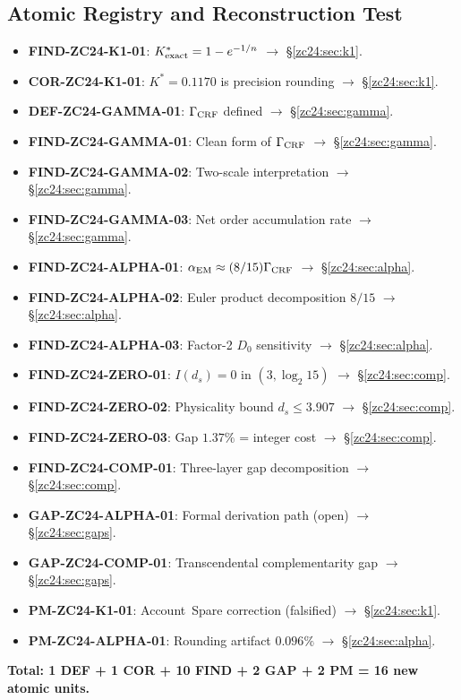 \documentclass[12pt, a4paper]{article}
\begin{document}
\subsection{Atomic Registry and Reconstruction Test}
\label{zc24:sec:registry}

\begin{formalbox}[title={Atomic Units Introduced by TASK-ZC24}]
\begin{itemize}[leftmargin=*]
  \item \textbf{FIND-ZC24-K1-01}: $K^*_{\rm exact}=1-e^{-1/n}$
    $\to$ \S\ref{zc24:sec:k1}.
  \item \textbf{COR-ZC24-K1-01}: $K^*=0.1170$ is precision rounding
    $\to$ \S\ref{zc24:sec:k1}.
  \item \textbf{DEF-ZC24-GAMMA-01}: $\Gamma_{\rm CRF}$ defined
    $\to$ \S\ref{zc24:sec:gamma}.
  \item \textbf{FIND-ZC24-GAMMA-01}: Clean form of $\Gamma_{\rm CRF}$
    $\to$ \S\ref{zc24:sec:gamma}.
  \item \textbf{FIND-ZC24-GAMMA-02}: Two-scale interpretation
    $\to$ \S\ref{zc24:sec:gamma}.
  \item \textbf{FIND-ZC24-GAMMA-03}: Net order accumulation rate
    $\to$ \S\ref{zc24:sec:gamma}.
  \item \textbf{FIND-ZC24-ALPHA-01}: $\alpha_{\rm EM}\approx(8/15)\Gamma_{\rm CRF}$
    $\to$ \S\ref{zc24:sec:alpha}.
  \item \textbf{FIND-ZC24-ALPHA-02}: Euler product decomposition $8/15$
    $\to$ \S\ref{zc24:sec:alpha}.
  \item \textbf{FIND-ZC24-ALPHA-03}: Factor-2 $D_0$ sensitivity
    $\to$ \S\ref{zc24:sec:alpha}.
  \item \textbf{FIND-ZC24-ZERO-01}: $I(d_s)=0$ in $(3,\log_2 15)$
    $\to$ \S\ref{zc24:sec:comp}.
  \item \textbf{FIND-ZC24-ZERO-02}: Physicality bound $d_s\leq 3.907$
    $\to$ \S\ref{zc24:sec:comp}.
  \item \textbf{FIND-ZC24-ZERO-03}: Gap $1.37\%$ = integer cost
    $\to$ \S\ref{zc24:sec:comp}.
  \item \textbf{FIND-ZC24-COMP-01}: Three-layer gap decomposition
    $\to$ \S\ref{zc24:sec:comp}.
  \item \textbf{GAP-ZC24-ALPHA-01}: Formal derivation path (open)
    $\to$ \S\ref{zc24:sec:gaps}.
  \item \textbf{GAP-ZC24-COMP-01}: Transcendental complementarity gap
    $\to$ \S\ref{zc24:sec:gaps}.
  \item \textbf{PM-ZC24-K1-01}: Account~Spare correction (falsified)
    $\to$ \S\ref{zc24:sec:k1}.
  \item \textbf{PM-ZC24-ALPHA-01}: Rounding artifact $0.096\%$
    $\to$ \S\ref{zc24:sec:alpha}.
\end{itemize}
\textbf{Total: 1 DEF + 1 COR + 10 FIND + 2 GAP + 2 PM
= 16 new atomic units.}
\end{formalbox}
\end{document}

